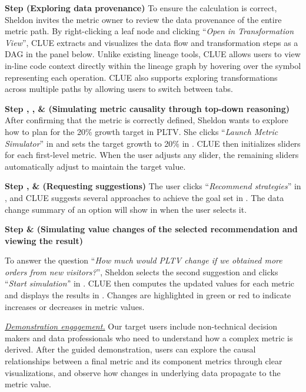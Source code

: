 \textbf{Step  (Exploring data provenance)} To ensure the
calculation is correct, Sheldon invites the metric owner to review the data
provenance of the entire metric path. By right-clicking a leaf node and clicking
``\textit{Open in Transformation View}'', CLUE extracts and visualizes the data
flow and transformation steps as a DAG in the panel below. Unlike existing
lineage tools, CLUE allows users to view in-line code context directly within
the lineage graph by hovering over the symbol representing each operation. CLUE
also supports exploring transformations across multiple paths by allowing users
to switch between tabs.

\textbf{Step , , \&  (Simulating
metric causality through top-down reasoning)} After confirming that the metric
is correctly defined, Sheldon wants to explore how to plan for the 20\% growth
target in PLTV. She clicks ``\textit{Launch Metric Simulator}'' in
 and sets the target growth to 20\% in . CLUE then
initializes sliders for each first-level metric. When the user adjusts any
slider, the remaining sliders automatically adjust to maintain the target value.

\textbf{Step ,  \&   (Requesting
suggestions)} The user clicks ``\textit{Recommend strategies}'' in
, and CLUE suggests several approaches to achieve the goal set in
. The data change summary of an option will show in
 when the user selects it. 

\textbf{Step  \&  (Simulating value changes of the
selected recommendation and viewing the result)} 

To answer the question ``\textit{How much would PLTV change if we obtained more
orders from new visitors?}'', Sheldon selects the second suggestion and clicks
``\textit{Start simulation'}' in . CLUE then computes the updated
values for each metric and displays the results in . Changes are
highlighted in green or red to indicate increases or decreases in metric values.

\emph{\underline{Demonstration engagement.}} Our target users include
non-technical decision makers and data professionals who need to understand how
a complex metric is derived. After the guided demonstration, users can explore
the causal relationships between a final metric and its component metrics
through clear visualizations, and observe how changes in underlying data
propagate to the metric value.